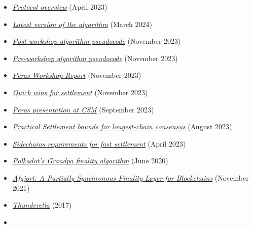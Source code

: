 \documentclass[10pt]{article}
\providecommand{\tightlist}{%
  \setlength{\itemsep}{0pt}\setlength{\parskip}{0pt}}
\begin{document}
\begin{itemize}
\tightlist
\item
  \href{https://docs.google.com/presentation/d/1QGCvDoOJIWug8jJgCNv3p9BZV-R8UZCyvosgNmN-lJU/edit?usp=sharing}{\color{blue}\textit{Protocol  overview}} (April 2023)
\item
  \href{https://docs.google.com/document/d/1w_jHsojcBxZHgGrr63ZGa4nhkgEpkL6a2cFYiq8Vf8c/edit}{\color{blue}\textit{Latest  version of the algorithm}} (March 2024)
\item
  \href{https://docs.google.com/document/d/1lywi65s1nQpAGgMpzPXD-sLzYNES-FZ8SHXF75VCKuI/edit\#heading=h.dqvlvyqlb2s4}{\color{blue}\textit{Post-workshop  algorithm pseudocode}} (November 2023)
\item
  \href{https://docs.google.com/document/d/1QMn1CqS4zSbKzvozhcAtc7MN_nMfVHhP25pMTxyhhZ8/edit\#heading=h.8bsvt41k7bj1}{\color{blue}\textit{Pre-workshop  algorithm pseudocode}} (November 2023)
\item
  \href{https://docs.google.com/document/d/1dv796m2Fc7WH38DNmGc68WOXnqtxj7F30o-kGzM4zKA/edit}{\color{blue}\textit{Peras  Workshop Report}} (November 2023)
\item
  \href{https://docs.google.com/document/d/1PsmhCYlpSlkpICghog0vBWVTnWAdICuQT1khGZ_feec/edit\#heading=h.wefcmsmvzoy5}{\color{blue}\textit{Quick  wins for settlement}} (November 2023)
\item
  \href{https://docs.google.com/presentation/d/1eKkrFeQMKlCRQV72yR7xg_RzD8WHaM4jPtUh9rwsrR0/edit\#slide=id.g27ebcf9a0c4_3_0}{\color{blue}\textit{Peras  presentation at CSM}} (September 2023)
\item
  \href{https://eprint.iacr.org/2022/1571.pdf}{\color{blue}\textit{Practical Settlement  bounds for longest-chain consensus}} (August 2023)
\item
  \href{https://input-output.atlassian.net/wiki/spaces/SID/pages/3829956994/Main+Chain+to+Sidechain+Finality+Improvement}{\color{blue}\textit{Sidechains  requirements for fast settlement}} (April 2023)
\item
  \href{https://github.com/w3f/consensus/blob/master/pdf/grandpa.pdf}{\color{blue}\textit{Polkadot's  Grandpa finality algorithm}} (June 2020)
\item
  \href{https://eprint.iacr.org/2019/504}{\color{blue}\textit{Afgjort: A Partially  Synchronous Finality Layer for Blockchains}} (November 2021)
\item
  \href{https://eprint.iacr.org/2017/913.pdf}{\color{blue}\textit{Thunderella}} (2017)
\item

\end{itemize}
\end{document}
